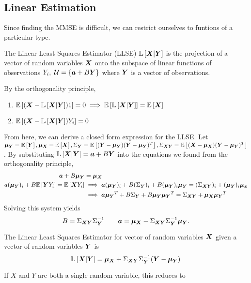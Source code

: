 \subsection{Linear Estimation}
Since finding the MMSE is difficult, we can restrict ourselves to funtions of a particular type.
\begin{definition}
	The Linear Least Squares Estimator (LLSE) $\mathbb{L}\left[\boldsymbol{X}|\boldsymbol{Y}\right]$ is the projection of a vector of random variables $\boldsymbol{X}$ onto the subspace of linear functions of observations $Y_i,\ \mathcal{U} = \left\{ \boldsymbol{a} + B\boldsymbol{Y} \right\}$ where $\boldsymbol{Y}$ is a vector of observations.
	\label{defn:llse}
\end{definition}
By the orthogonality principle,
\begin{enumerate}
	\item $\mathbb{E}\left[(\boldsymbol{X} - \mathbb{L}\left[\boldsymbol{X}|\boldsymbol{Y}\right])1\right] = 0 \implies \mathbb{E}\left[\mathbb{L}\left[\boldsymbol{X}|\boldsymbol{Y}\right]\right] = \mathbb{E}\left[\boldsymbol{X}\right]$
	\item $\mathbb{E}\left[(\boldsymbol{X} - \mathbb{L}\left[\boldsymbol{X}|\boldsymbol{Y}\right])Y_i\right] = 0$
\end{enumerate}
From here, we can derive a closed form expression for the LLSE.
Let $\boldsymbol{\mu_{Y}} = \mathbb{E}\left[\boldsymbol{Y}\right], \boldsymbol{\mu_{X}} = \mathbb{E}\left[\boldsymbol{X}\right], \Sigma_{\boldsymbol{Y}} = \mathbb{E}\left[(\boldsymbol{Y}-\boldsymbol{\mu_Y})(\boldsymbol{Y}-\boldsymbol{\mu_Y})^T\right], \Sigma_{\boldsymbol{XY}} = \mathbb{E}\left[(\boldsymbol{X}-\boldsymbol{\mu_X})(\boldsymbol{Y}-\boldsymbol{\mu_Y})^T\right]$.
By substituting $\mathbb{L}\left[\boldsymbol{X}|\boldsymbol{Y}\right] = \boldsymbol{a}+B\boldsymbol{Y}$ into the equations we found from the orthogonality principle,
\begin{align*}
	\boldsymbol{a}+B\boldsymbol{\mu_Y} &= \boldsymbol{\mu_X} \\
	a(\boldsymbol{\mu_Y})_i + B \mathbb{E}\left[\boldsymbol{Y}Y_i\right] = \mathbb{E}\left[\boldsymbol{X}Y_i\right] &\implies \boldsymbol{a}(\boldsymbol{\mu_{Y}})_i + B(\Sigma_{\boldsymbol{Y}})_i + B(\boldsymbol{\mu_{Y}})_i\boldsymbol{\mu_Y} = (\Sigma_{\boldsymbol{XY}})_i + (\boldsymbol{\mu_{Y}})_i\boldsymbol{\mu_x}\\
	&\implies \boldsymbol{a}\boldsymbol{\mu_Y}^T + B\Sigma_{\boldsymbol{Y}}+B\boldsymbol{\mu_Y\mu_Y}^T = \Sigma_{\boldsymbol{XY}}+\boldsymbol{\mu_X\mu_Y}^T
\end{align*}
Solving this system yields
\[
	B = \Sigma_{\boldsymbol{XY}}\Sigma_{\boldsymbol{Y}}^{-1} \qquad \boldsymbol{a} = \boldsymbol{\mu_X} - \Sigma_{\boldsymbol{XY}}\Sigma_{\boldsymbol{Y}}^{-1}\boldsymbol{\mu_Y}.
\]
\begin{theorem}
	The Linear Least Squares Estimator for vector of random variables $\boldsymbol{X}$ given a vector of random variables $\boldsymbol{Y}$ is \[
		\mathbb{L}\left[\boldsymbol{X}|\boldsymbol{Y}\right] = \boldsymbol{\mu_X} + \Sigma_{\boldsymbol{XY}}\Sigma_{\boldsymbol{Y}}^{-1}(\boldsymbol{Y}-\boldsymbol{\mu_Y})
	\]
	\label{thm:llse-vector}
\end{theorem}
If $X$ and $Y$ are both a single random variable, this reduces to
